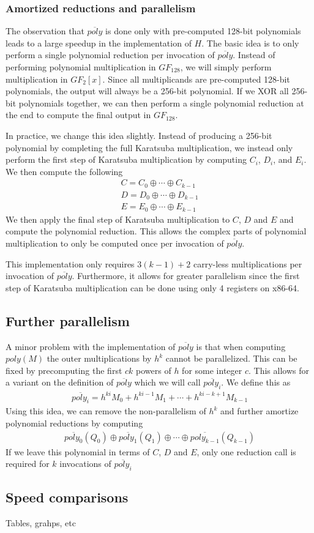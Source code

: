 \documentclass[hctr.tex]{subfiles}
\begin{document}
\subsubsection{Amortized reductions and parallelism}
The observation that $\overline{poly}$ is done only with pre-computed 128-bit polynomials leads to a large speedup in the implementation of $H$. The basic idea is to only perform a single polynomial reduction per invocation of $\overline{poly}$. Instead of performing polynomial multiplication in $GF_{128}$, we will simply perform multiplication in $GF_{2}[x]$. Since all multiplicands are pre-computed 128-bit polynomials, the output will always be a 256-bit polynomial. If we XOR all 256-bit polynomials together, we can then perform a single polynomial reduction at the end to compute the final output in $GF_{128}$.

In practice, we change this idea slightly. Instead of producing a 256-bit polynomial by completing the full Karatsuba multiplication, we instead only perform the first step of Karatsuba multiplication by computing $C_i$, $D_i$, and $E_i$. We then compute the following
\begin{gather*}
       C = C_0 \oplus \cdots \oplus C_{k-1}\\
       D = D_0 \oplus \cdots \oplus D_{k-1}\\
       E = E_0 \oplus \cdots \oplus E_{k-1}
\end{gather*}
We then apply the final step of Karatsuba multiplication to $C$, $D$ and $E$ and compute the polynomial reduction. This allows the complex parts of polynomial multiplication to only be computed once per invocation of $\overline{poly}$.

This implementation only requires $3(k-1) + 2$ carry-less multiplications per invocation of $\overline{poly}$. Furthermore, it allows for greater parallelism since the first step of Karatsuba multiplication can be done using only 4 registers on x86-64.

\subsection{Further parallelism}
A minor problem with the implementation of $\overline{poly}$ is that when computing $poly(M)$ the outer multiplications by $h^{k}$ cannot be parallelized. This can be fixed by precomputing the first $ck$ powers of $h$ for some integer $c$. This allows for a variant on the definition of $\overline{poly}$ which we will call $\overline{poly_i}$. We define this as
\begin{align*}
       \overline{poly_i} = h^{ki}M_0 + h^{ki-1}M_1 + \cdots + h^{ki - k + 1}M_{k-1}
\end{align*}
Using this idea, we can remove the non-parallelism of $h^k$ and further amortize polynomial reductions by computing
\begin{align*}
	\overline{poly_0}(Q_0) \oplus \overline{poly_1}(Q_1) \oplus \cdots \oplus \overline{poly_{k-1}}(Q_{k-1})
\end{align*}
If we leave this polynomial in terms of $C$, $D$ and $E$, only one reduction call is required for $k$ invocations of $\overline{poly_i}$

\subsection{Speed comparisons}
{\color{red} Tables, grahps, etc}


\printbibliography[heading=bibintoc]
\end{document}
